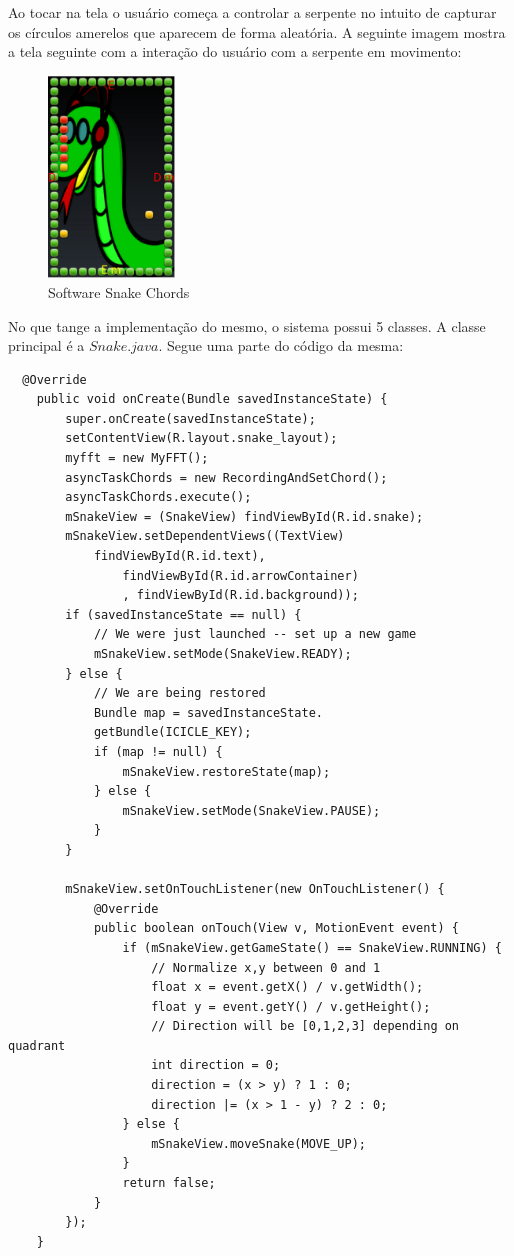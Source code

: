 \newpage
Ao tocar na tela o usuário começa a controlar a serpente no intuito de capturar os círculos amerelos que aparecem de forma aleatória. A seguinte imagem mostra a tela seguinte com a interação do usuário com a serpente em movimento:
\begin{figure}[h!]
        \centering
        \includegraphics[width=0.3\textwidth]{figuras/snake_2.eps}
        \caption{Software Snake Chords}
        \label{fig:cronograma}
\end{figure}

No que tange a implementação do mesmo, o sistema possui 5 classes. A classe principal é a $Snake.java$. Segue uma parte do código da mesma:
\begin{lstlisting}
  @Override
    public void onCreate(Bundle savedInstanceState) {
        super.onCreate(savedInstanceState);
        setContentView(R.layout.snake_layout);
        myfft = new MyFFT();
        asyncTaskChords = new RecordingAndSetChord();
        asyncTaskChords.execute();
        mSnakeView = (SnakeView) findViewById(R.id.snake);
        mSnakeView.setDependentViews((TextView) 
        	findViewById(R.id.text),
                findViewById(R.id.arrowContainer)
                , findViewById(R.id.background));
        if (savedInstanceState == null) {
            // We were just launched -- set up a new game
            mSnakeView.setMode(SnakeView.READY);
        } else {
            // We are being restored
            Bundle map = savedInstanceState.
            getBundle(ICICLE_KEY);
            if (map != null) {
                mSnakeView.restoreState(map);
            } else {
                mSnakeView.setMode(SnakeView.PAUSE);
            }
        }

        mSnakeView.setOnTouchListener(new OnTouchListener() {
            @Override
            public boolean onTouch(View v, MotionEvent event) {
                if (mSnakeView.getGameState() == SnakeView.RUNNING) {
                    // Normalize x,y between 0 and 1
                    float x = event.getX() / v.getWidth();
                    float y = event.getY() / v.getHeight();
                    // Direction will be [0,1,2,3] depending on quadrant
                    int direction = 0;
                    direction = (x > y) ? 1 : 0;
                    direction |= (x > 1 - y) ? 2 : 0;
                } else {
                    mSnakeView.moveSnake(MOVE_UP);
                }
                return false;
            }
        });
    }
\end{lstlisting}

